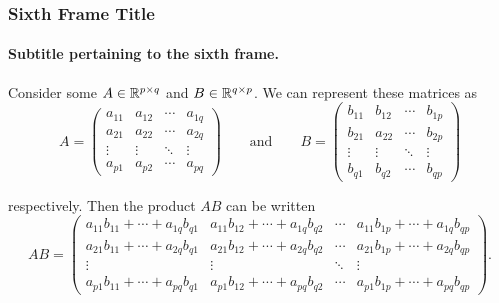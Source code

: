 \documentclass[aspectratio=169]{beamer}
\numberwithin{equation}{section}
\begin{document}
\begin{frame}
\frametitle{Sixth Frame Title}
\framesubtitle{Subtitle pertaining to the sixth frame.}

Consider some $A \in \mathbb{R}^{p \times q}$ and $B \in \mathbb{R}^{q \times p}$. We can represent these matrices as
\begin{equation*}
    A = \begin{pmatrix} a_{11} & a_{12} & \cdots & a_{1q} \\ a_{21} & a_{22} & \cdots & a_{2q} \\ \vdots & \vdots & \ddots & \vdots \\ a_{p1} & a_{p2} & \cdots & a_{pq} \end{pmatrix} \qquad \text{and} \qquad B = \begin{pmatrix} b_{11} & b_{12} & \cdots & b_{1p} \\ b_{21} & a_{22} & \cdots & b_{2p} \\ \vdots & \vdots & \ddots & \vdots \\ b_{q1} & b_{q2} & \cdots & b_{qp} \end{pmatrix}
\end{equation*}

respectively. Then the product $AB$ can be written
\begin{equation*}
    AB = \begin{pmatrix} a_{11} b_{11} + \cdots + a_{1q} b_{q1} & a_{11} b_{12} + \cdots + a_{1q} b_{q2} & \cdots & a_{11} b_{1p} + \cdots + a_{1q} b_{qp} \\ a_{21} b_{11} + \cdots + a_{2q} b_{q1} & a_{21} b_{12} + \cdots + a_{2q} b_{q2} & \cdots & a_{21} b_{1p} + \cdots + a_{2q} b_{qp} \\ \vdots & \vdots & \ddots & \vdots \\ a_{p1} b_{11} + \cdots + a_{pq} b_{q1} & a_{p1} b_{12} + \cdots + a_{pq} b_{q2} & \cdots & a_{p1} b_{1p} + \cdots + a_{pq} b_{qp} \end{pmatrix}.
\end{equation*}

\end{frame}
\end{document}
